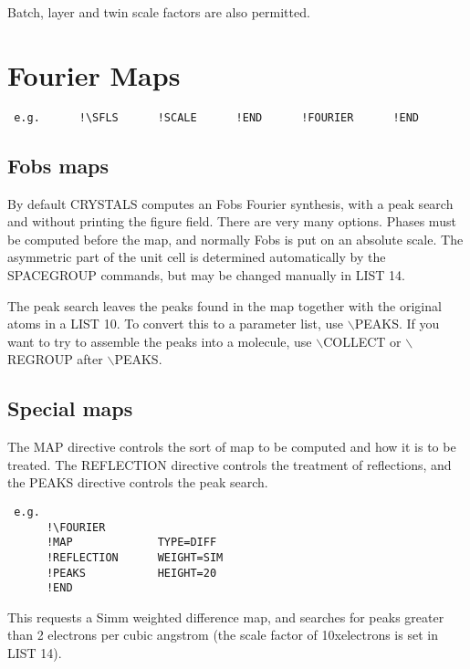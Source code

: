 \documentclass[10pt,a4paper]{report}
\begin{document}
Batch, layer and twin scale factors are also permitted.



\chapter{Fourier Maps}
\small\begin{verbatim} e.g.      !\SFLS      !SCALE      !END      !FOURIER      !END\end{verbatim}\normalsize



\section{Fobs maps}


By default CRYSTALS computes an Fobs Fourier synthesis, with a peak
 search and without printing the figure field. There are very many options.
 Phases must be computed before the map, and normally Fobs is put
 on an absolute scale. The asymmetric part of the unit cell
 is determined automatically by the SPACEGROUP commands, but may be changed
 manually in LIST 14.


The peak search leaves the peaks found in the map together with the
original atoms in a LIST 10. To convert this to a parameter list, use
$\backslash$PEAKS. If you want to
 try to assemble the peaks into a molecule, use
 $\backslash$COLLECT or $\backslash$REGROUP after $\backslash$PEAKS.



\section{Special maps}


The MAP directive controls the sort of map to be computed and how it is
 to be treated. The REFLECTION directive controls the treatment of reflections,
 and the PEAKS directive controls the peak search.

\small\begin{verbatim}
 e.g.
      !\FOURIER
      !MAP             TYPE=DIFF
      !REFLECTION      WEIGHT=SIM
      !PEAKS           HEIGHT=20
      !END
\end{verbatim}\normalsize




This requests a Simm weighted difference map, and searches for peaks
 greater than 2 electrons per cubic angstrom (the scale factor of
 10xelectrons is set
 in LIST 14).
\end{document}
